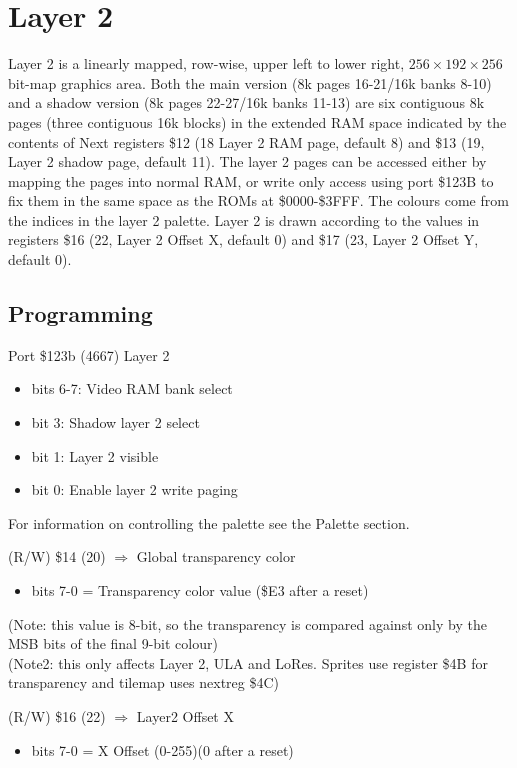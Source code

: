 \section{Layer 2}
Layer 2 is a linearly mapped, row-wise, upper left to lower right,
$256\times192\times256$ bit-map graphics area.  Both the main version
(8k pages 16-21/16k banks 8-10) and a shadow version (8k pages
22-27/16k banks 11-13) are six contiguous 8k pages (three contiguous
16k blocks) in the extended RAM space indicated by the contents of
Next registers \$12 (18 Layer 2 RAM page, default 8) and \$13 (19,
Layer 2 shadow page, default 11).  The layer 2 pages can be accessed
either by mapping the pages into normal RAM, or write only access
using port \$123B to fix them in the same space as the ROMs at
\$0000-\$3FFF.  The colours come from the indices in the layer 2
palette.  Layer 2 is drawn according to the values in registers \$16
(22, Layer 2 Offset X, default 0) and \$17 (23, Layer 2 Offset Y,
default 0).

\subsection{Programming}

Port \$123b (4667) Layer 2
\begin{itemize}
  \item[] bits 6-7: Video RAM bank select
  \item[] bit 3: Shadow layer 2 select
  \item[] bit 1: Layer 2 visible
  \item[] bit 0: Enable layer 2 write paging
\end{itemize}

For information on controlling the palette see the Palette section.

(R/W) \$14 (20) $\Rightarrow$ Global transparency color
\begin{itemize}
\item[] bits 7-0 = Transparency color value (\$E3 after a reset)
\end{itemize}
(Note: this value is 8-bit, so the transparency is compared against
only by the MSB bits of the final 9-bit colour)\\
(Note2: this only affects Layer 2, ULA and LoRes. Sprites use register
\$4B for transparency and tilemap uses nextreg \$4C)

(R/W) \$16 (22) $\Rightarrow$ Layer2 Offset X
\begin{itemize}
\item[] bits 7-0 = X Offset (0-255)(0 after a reset)
\end{itemize}

